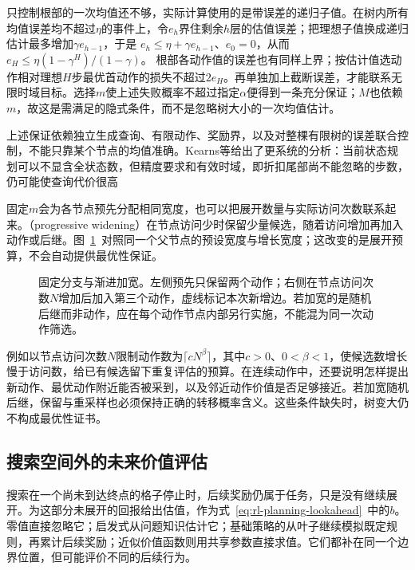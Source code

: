只控制根部的一次均值还不够，实际计算使用的是带误差的递归子值。在树内所有均值误差均不超过$\eta$的事件上，令$e_h$界住剩余$h$层的估值误差；把理想子值换成递归估计最多增加$\gamma e_{h-1}$，于是
$e_h\leq\eta+\gamma e_{h-1}$、$e_0=0$，从而
$e_H\leq\eta(1-\gamma^H)/(1-\gamma)$。
根部各动作值的误差也有同样上界；按估计值选动作相对理想$H$步最优首动作的损失不超过$2e_H$。再单独加上截断误差，才能联系无限时域目标。选择$m$使上述失败概率不超过指定$\alpha$便得到一条充分保证；$M$也依赖$m$，故这是需满足的隐式条件，而不是忽略树大小的一次均值估计。

上述保证依赖独立生成查询、有限动作、奖励界，以及对整棵有限树的误差联合控制，不能只靠某个节点的均值准确。Kearns等给出了更系统的分析：当前状态规划可以不显含全状态数，但精度要求和有效时域，即折扣尾部尚不能忽略的步数，仍可能使查询代价很高

固定$m$会为各节点预先分配相同宽度，也可以把展开数量与实际访问次数联系起来。（progressive widening）在节点访问少时保留少量候选，随着访问增加再加入动作或后继。图~\ref{fig:rl-planning-widening}~对照同一个父节点的预设宽度与增长宽度；这改变的是展开预算，不会自动提供最优性保证。

\begin{figure}[htbp]
 \centering
 
 \caption{固定分支与渐进加宽。左侧预先只保留两个动作；右侧在节点访问次数$N$增加后加入第三个动作，虚线标记本次新增边。若加宽的是随机后继而非动作，应在每个动作节点内部另行实施，不能混为同一次动作筛选。}
 \label{fig:rl-planning-widening}
\end{figure}

例如以节点访问次数$N$限制动作数为$\lceil cN^\beta\rceil$，其中$c>0$、$0<\beta<1$，使候选数增长慢于访问数，给已有候选留下重复评估的预算。在连续动作中，还要说明怎样提出新动作、最优动作附近能否被采到，以及邻近动作价值是否足够接近。若加宽随机后继，保留与重采样也必须保持正确的转移概率含义。这些条件缺失时，树变大仍不构成最优性证书。

\subsection{搜索空间外的未来价值评估}
\label{sec:rl-planning-leaf-value}

搜索在一个尚未到达终点的格子停止时，后续奖励仍属于任务，只是没有继续展开。为这部分未展开的回报给出估值，作为式~\eqref{eq:rl-planning-lookahead}~中的$b$。零值直接忽略它；启发式从问题知识估计它；基础策略的从叶子继续模拟既定规则，再累计后续奖励；近似价值函数则用共享参数直接求值。它们都补在同一个边界位置，但可能评价不同的后续行为。

